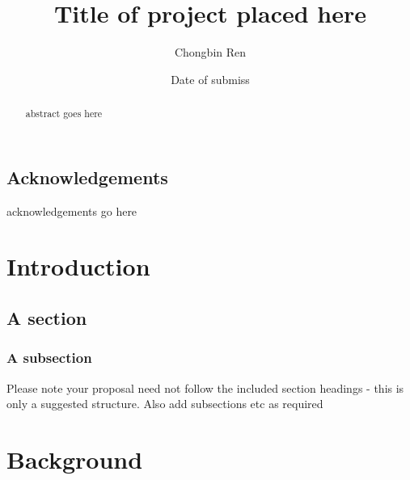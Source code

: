 \documentclass{mproj}
\begin{document}
\sloppy
\title{Title of project placed here}
\author{Chongbin Ren}
\date{Date of submiss}
\maketitle

\begin{abstract}
abstract goes here
\end{abstract}

\educationalconsent


\newpage
\section*{Acknowledgements}

acknowledgements go here

\tableofcontents

\chapter{Introduction}\label{intro}

\section{A section}
\subsection{A subsection}
Please note your proposal need not follow the included section headings - this is only a suggested structure. Also add subsections etc as required



\chapter{Background}\label{background}
\end{document}

